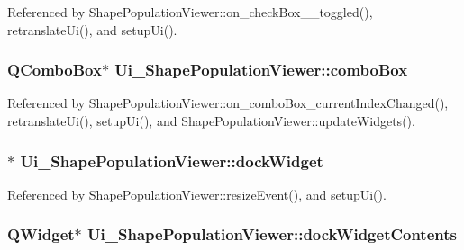 Referenced by Shape\-Population\-Viewer\-::on\-\_\-check\-Box\-\_\-\_\-toggled(), retranslate\-Ui(), and setup\-Ui().

\hypertarget{class_ui___shape_population_viewer_a64011f16a878e4138f972f03100bd8e5}{
\subsubsection[{combo\-Box}]{\setlength{\rightskip}{0pt plus 5cm}Q\-Combo\-Box$\ast$ Ui\-\_\-\-Shape\-Population\-Viewer\-::combo\-Box}}\label{class_ui___shape_population_viewer_a64011f16a878e4138f972f03100bd8e5}


Referenced by Shape\-Population\-Viewer\-::on\-\_\-combo\-Box\-\_\-current\-Index\-Changed(), retranslate\-Ui(), setup\-Ui(), and Shape\-Population\-Viewer\-::update\-Widgets().

\hypertarget{class_ui___shape_population_viewer_a17a3970df680c444831ce36b82e86c30}{
\subsubsection[{dock\-Widget}]{$\ast$ Ui\-\_\-\-Shape\-Population\-Viewer\-::dock\-Widget}}\label{class_ui___shape_population_viewer_a17a3970df680c444831ce36b82e86c30}


Referenced by Shape\-Population\-Viewer\-::resize\-Event(), and setup\-Ui().

\hypertarget{class_ui___shape_population_viewer_a8b9aeca277b4e22cd174bf665d49c6c4}{
\subsubsection[{dock\-Widget\-Contents}]{\setlength{\rightskip}{0pt plus 5cm}Q\-Widget$\ast$ Ui\-\_\-\-Shape\-Population\-Viewer\-::dock\-Widget\-Contents}}\label{class_ui___shape_population_viewer_a8b9aeca277b4e22cd174bf665d49c6c4}


